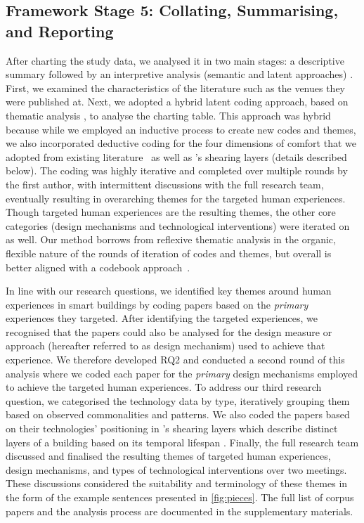 \subsection{Framework Stage 5: Collating, Summarising, and Reporting}
After charting the study data, we analysed it in two main stages: a descriptive summary followed by an interpretive analysis (semantic and latent approaches) \cite{byrne2021worked}. First, we examined the characteristics of the literature such as the venues they were published at. Next, we adopted a hybrid latent coding approach, based on thematic analysis \cite{braun2023thematic}, to analyse the charting table. This approach was hybrid because while we employed an inductive process to create new codes and themes, we also incorporated deductive coding for the four dimensions of comfort that we adopted from existing literature~\cite{alavi2017comfort} as well as \citet{brand1995buildings}'s shearing layers (details described below). The coding was highly iterative and completed over multiple rounds by the first author, with intermittent discussions with the full research team, eventually resulting in overarching themes for the targeted human experiences. Though targeted human experiences are the resulting themes, the other core categories (design mechanisms and technological interventions) were iterated on as well. Our method borrows from reflexive thematic analysis in the organic, flexible nature of the rounds of iteration of codes and themes, but overall is better aligned with a codebook approach~\cite{braun2022conceptual}.

In line with our research questions, we identified key themes around human experiences in smart buildings by coding papers based on the \emph{primary} experiences they targeted. After identifying the targeted experiences, we recognised that the papers could also be analysed for the design measure or approach (hereafter referred to as design mechanism) used to achieve that experience. We therefore developed RQ2 and conducted a second round of this analysis where we coded each paper for the \emph{primary} design mechanisms employed to achieve the targeted human experiences. To address our third research question, we categorised the technology data by type, iteratively grouping them based on observed commonalities and patterns. We also coded the papers based on their technologies' positioning in \citet{brand1995buildings}'s shearing layers which describe distinct layers of a building based on its temporal lifespan \cite{brand1995buildings}.  Finally, the full research team discussed and finalised the resulting themes of targeted human experiences, design mechanisms, and types of technological interventions over two meetings. These discussions considered the suitability and terminology of these themes in the form of the example sentences presented in \autoref{fig:pieces}. The full list of corpus papers and the analysis process are documented in the supplementary materials.


